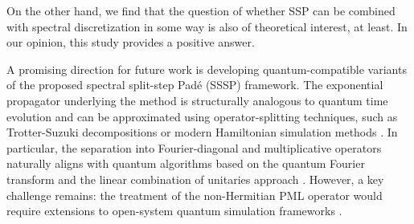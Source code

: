 \documentclass[11pt,a4paper]{article}
\theoremstyle{plain}%
\theoremstyle{definition}
\theoremstyle{remark}
\begin{document}
On the other hand, we find that the question of whether SSP can be combined with spectral discretization in some way is also of theoretical interest, at least. In our opinion, this study provides a positive answer. 

% 

A promising direction for future work is developing quantum-compatible variants of the proposed spectral split-step Pad\'e (SSSP) framework. 
The exponential propagator underlying the method is structurally analogous to quantum time evolution and can be approximated using operator-splitting techniques, such as Trotter-Suzuki decompositions \cite{suzuki1992general} or modern Hamiltonian simulation methods \cite{lloyd1996universal}. 
In particular, the separation into Fourier-diagonal and multiplicative operators naturally aligns with quantum algorithms based on the quantum Fourier transform and the linear combination of unitaries approach \cite{berry2007efficient}. 
However, a key challenge remains: the treatment of the non-Hermitian PML operator would require extensions to open-system quantum simulation frameworks \cite{kushida2025quantum}.




\appendix
\end{document}
